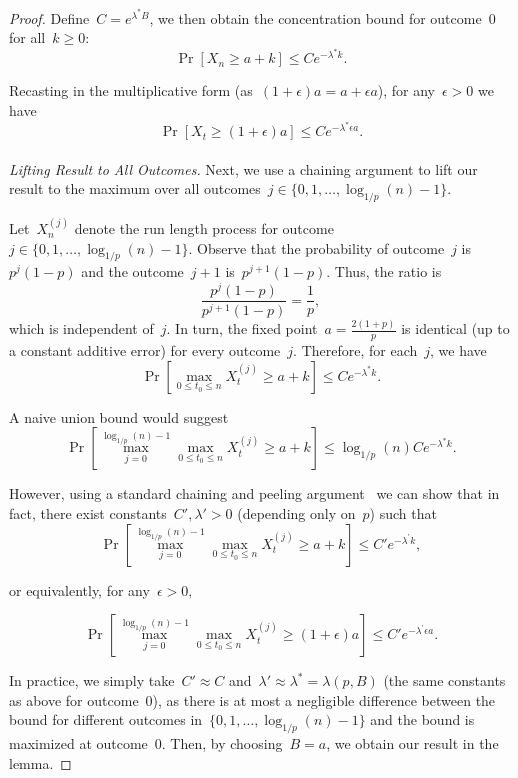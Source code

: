 \begin{proof}
Define~$C = e^{\lambda^{*}B}$, we then obtain the concentration bound for outcome~$0$ for all~$k \geq 0$:
$$\Pr [X_n \geq a + k] \leq Ce^{-\lambda^{*}k}.$$

Recasting in the multiplicative form (as~$(1+\epsilon)a = a + \epsilon a$), for any~$\epsilon > 0$ we have
$$\Pr[X_t \geq (1 + \epsilon)a] \leq Ce^{-\lambda^{*} \epsilon a}.$$\\

\textit{Lifting Result to All Outcomes.} Next, we use a chaining argument to lift our result to the maximum over all outcomes~$ j \in \{ 0,1,\ldots,\log_{1/p}(n)-1 \} $.

Let~$X_{n}^{(j)}$ denote the run length process for outcome \\ $j \in \{0,1,\ldots,\log_{1/p}(n)-1\}$. Observe that the probability of outcome~$j$ is~$p^{j}(1-p)$ and the outcome~$j+1$ is~$p^{j+1}(1-p)$. Thus, the ratio is
$$\frac{p^{j}(1-p)}{p^{j+1}(1-p)}=\frac{1}{p},$$
which is independent of~$j$. In turn, the fixed point~$a = \frac{2(1+p)}{p}$ is identical (up to a constant additive error) for every outcome~$j$. Therefore, for each~$j$, we have
$$\Pr \left[ \underset{0 \leq t_0 \leq n}{\max} X_t^{(j)} \geq a + k \right] \leq Ce^{-\lambda^{*}k}.$$

A naive union bound would suggest
$$\Pr \left[ \max_{j=0}^{\log_{1/p}(n)-1} \underset{0 \leq t_0 \leq n}{\max} X_t^{(j)} \geq a + k \right] \leq \log_{1/p}(n)Ce^{-\lambda^{*}k}.$$ 

However, using a standard chaining and peeling argument~\cite{bound_book} we can show that in fact, there exist constants~$C',\lambda' > 0$ (depending only on~$p$) such that 
$$\Pr \left[ \max_{j=0}^{\log_{1/p}(n)-1} \underset{0 \leq t_0 \leq n}{\max} X_t^{(j)} \geq a + k \right] \leq C'e^{-\lambda^{'}k},$$

or equivalently, for any~$\epsilon > 0,$

$$\Pr \left[ \max_{j=0}^{\log_{1/p}(n)-1} \underset{0 \leq t_0 \leq n}{\max} X_t^{(j)} \geq (1 + \epsilon)a  \right] \leq C'e^{-\lambda^{'} \epsilon a}.$$

In practice, we simply take~$C' \approx C$ and~$\lambda' \approx \lambda^{*} = \lambda(p,B)$ (the same constants as above for outcome~$0$), as there is at most a negligible difference between the bound for different outcomes in~$\{0,1,\ldots,\log_{1/p}(n)-1\}$ and the bound is maximized at outcome~$0$. Then, by choosing~$B=a$, we obtain our result in the lemma. 
\end{proof}

